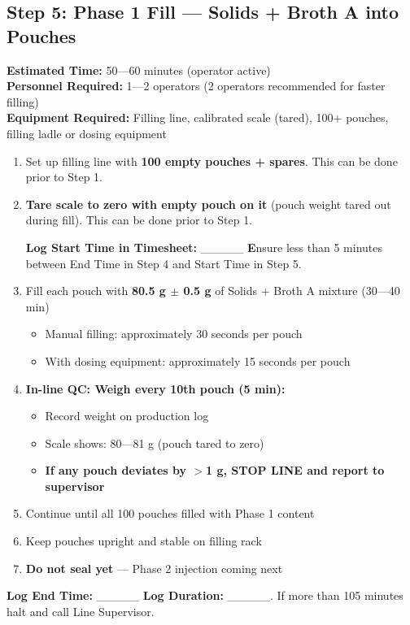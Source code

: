 {%

\subsection*{Step 5: Phase 1 Fill --- Solids + Broth A into Pouches}

\textbf{Estimated Time:} 50---60 minutes (operator active) \\
\textbf{Personnel Required:} 1---2 operators (2 operators recommended for faster filling) \\
\textbf{Equipment Required:} Filling line, calibrated scale (tared), 100+ pouches, filling ladle or dosing equipment

\begin{enumerate}[leftmargin=1.5em]
\item Set up filling line with \textbf{100 empty pouches + spares}.
This can be done prior to Step 1. 
\item \textbf{Tare scale to zero with empty pouch on it} (pouch weight tared out during fill).
This can be done prior to Step 1. 

\textbf{Log Start Time in Timesheet:} \_\_\_\_\_
\textbf Ensure less than 5 minutes between End Time in Step 4 and Start Time in Step 5. 
\item Fill each pouch with \textbf{80.5 g $\pm$ 0.5 g} of Solids + Broth A mixture (30---40 min)
  \begin{itemize}
  \item Manual filling: approximately 30 seconds per pouch
  \item With dosing equipment: approximately 15 seconds per pouch
  \end{itemize}
\item \textbf{In-line QC: Weigh every 10th pouch (5 min):}
  \begin{itemize}
  \item Record weight on production log
  \item Scale shows: 80---81 g (pouch tared to zero)
  
\item \textbf{If any pouch deviates by $>$1 g, STOP LINE and report to supervisor}
  \end{itemize}
\item Continue until all 100 pouches filled with Phase 1 content
\item Keep pouches upright and stable on filling rack
\item \textbf{Do not seal yet} --- Phase 2 injection coming next
\end{enumerate}
\textbf{Log End Time:} \_\_\_\_\_
\textbf{Log Duration:} \_\_\_\_\_.
If more than 105 minutes halt and call Line Supervisor.

}
